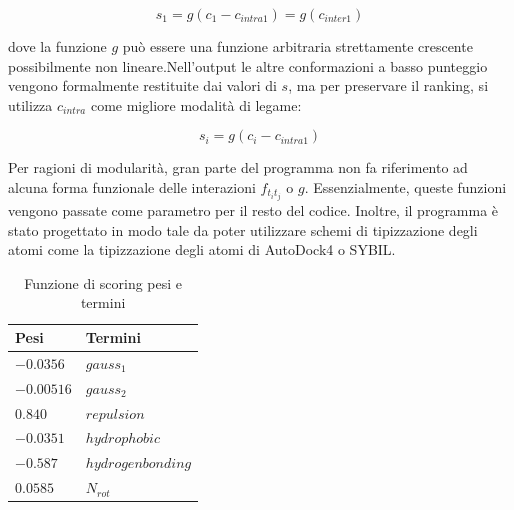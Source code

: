 \begin{equation}
    s_1 = g(c_1 - c_{intra1}) = g(c_{inter1})
\end{equation}

dove la funzione $g$ può essere una funzione arbitraria strettamente crescente possibilmente non lineare.\newline Nell'output le altre conformazioni a basso punteggio vengono formalmente restituite dai valori di $s$, ma per preservare il ranking, si utilizza $c_{intra}$ come migliore modalità di legame:

\begin{equation}
    s_i = g(c_i - c_{intra1})
\end{equation}

Per ragioni di modularità, gran parte del programma non fa riferimento ad alcuna forma funzionale delle interazioni $f_{t_it_j}$ o $g$. Essenzialmente, queste funzioni vengono passate come parametro per il resto del codice.\newline
Inoltre, il programma è stato progettato in modo tale da poter utilizzare schemi di tipizzazione degli atomi come la tipizzazione degli atomi di AutoDock4 o SYBIL.\newline

\begin{table}[H]
    \centering
    \begin{tabular}{|l|l|}
        \hline
        \textbf{Pesi} & \textbf{Termini}\\
        \hline
        $-0.0356$ & $gauss_1$\\
        $-0.00516$ & $gauss_2$\\
        $0.840$ & $repulsion$\\
        $-0.0351$ & $hydrophobic$\\
        $-0.587$ & $hydrogen bonding$\\
        $0.0585$ & $N_{rot}$\\
        \hline
    \end{tabular}
    \caption{Funzione di scoring pesi e termini}
    \label{tab:Tabella Pesi e Termini}
\end{table}

